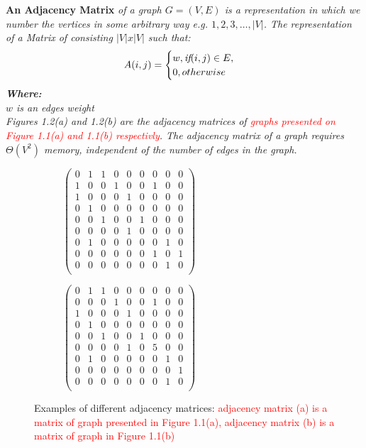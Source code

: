 \newline
\begin{definition} \textbf{An Adjacency Matrix } \emph{of a graph $G=(V, E)$ is a representation in which we number the vertices in some arbitrary way e.g. $1,2,3,\dots, |V|$. The representation of a Matrix of
consisting $|V|x|V|$ such that: 
$$A(i,j)=
\begin{cases}
w, \emph{if}  (i,j)\in E,\\
0, otherwise\\
\end{cases}$$
\textbf{Where:}\\
$w$ is an edges weight\\
\newline
}
\emph{Figures 1.2(a) and 1.2(b) are the adjacency matrices of \textcolor{red}{graphs presented on Figure 1.1(a) and 1.1(b) respectivly}.
The adjacency matrix of a graph requires $\varTheta(V^2)$ memory, independent of the number of edges in the graph.}
\end{definition}
\begin{figure}[!h]
	\centering
	\begin{subfigure}{.35\textwidth}
	  \centering
	  $\begin{pmatrix}
		0&1&1&0&0&0&0&0&0\\
		1&0&0&1&0&0&1&0&0\\
		1&0&0&0&1&0&0&0&0\\
		0&1&0&0&0&0&0&0&0\\
		0&0&1&0&0&1&0&0&0\\
		0&0&0&0&1&0&0&0&0\\
		0&1&0&0&0&0&0&1&0\\
		0&0&0&0&0&0&1&0&1\\
		0&0&0&0&0&0&0&1&0\\
	\end{pmatrix}$
	  \caption{}
	  \label{fig:sub1}
	\end{subfigure}
	\begin{subfigure}{.35\textwidth}
	  \centering
	  $\begin{pmatrix}
		0&1&1&0&0&0&0&0&0\\
		0&0&0&1&0&0&1&0&0\\
		1&0&0&0&1&0&0&0&0\\
		0&1&0&0&0&0&0&0&0\\
		0&0&1&0&0&1&0&0&0\\
		0&0&0&0&1&0&5&0&0\\
		0&1&0&0&0&0&0&1&0\\
		0&0&0&0&0&0&0&0&1\\
		0&0&0&0&0&0&0&1&0\\
	\end{pmatrix}$
	  \caption{}
	  \label{fig:sub2}
	\end{subfigure}
	\caption{Examples of different adjacency matrices: \textcolor{red}{adjacency matrix (a) is a matrix of graph presented in Figure 1.1(a), adjacency matrix (b) is a matrix of graph in Figure 1.1(b)}}
	\label{fig:test}
\end{figure}

